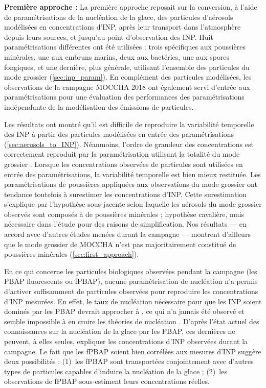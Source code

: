\medskip
\noindent
\textbf{Première approche :}  
La première approche reposait sur la conversion, à l’aide de paramétrisations de la nucléation de la glace, des particules d’aérosols modélisées en concentrations d’INP, après leur transport dans l’atmosphère depuis leurs sources, et jusqu’au point d’observation des INP.  
Huit paramétrisations différentes ont été utilisées : trois spécifiques aux poussières minérales, une aux embruns marins, deux aux bactéries, une aux spores fongiques, et une dernière, plus générale, utilisant l’ensemble des particules du mode grossier (\cref{sec:inp_param}).  
En complément des particules modélisées, les observations de la campagne MOCCHA 2018 ont également servi d’entrée aux paramétrisations pour une évaluation des performances des paramétrisations indépendante de la modélisation des émissions de particules.  

Les résultats ont montré qu’il est difficile de reproduire la variabilité temporelle des INP à partir des particules modélisées en entrée des paramétrisations (\cref{sec:aerosols_to_INP}).  
Néanmoins, l'ordre de grandeur des concentrations est correctement reproduit par la paramétrisation utilisant la totalité du mode grossier \citep{demott_predicting_2010}.  
Lorsque les concentrations observées de particules sont utilisées en entrée des paramétrisations, la variabilité temporelle est bien mieux restituée.  
Les paramétrisations de poussières appliquées aux observations du mode grossier ont tendance toutefois à surestimer les concentrations d’INP.  
Cette surestimation s’explique par l’hypothèse sous-jacente selon laquelle les aérosols du mode grossier observés sont composés à  de poussières minérales ; hypothèse cavalière, mais nécessaire dans l'étude pour des raisons de simplification. 
Nos résultats --- en accord avec d’autres études menées durant la campagne --- montrent d'ailleurs que le mode grossier de MOCCHA n’est pas majoritairement constitué de poussières minérales (\cref{sec:first_approach}).  

En ce qui concerne les particules biologiques observées pendant la campagne (les PBAP fluorescents ou fPBAP), aucune paramétrisation de nucléation n’a permis d’activer suffisamment de particules observées pour reproduire les concentrations d’INP mesurées.  
En effet, le taux de nucléation nécessaire pour que les INP soient dominés par les PBAP devrait approcher  à , ce qui n'a jamais été observé et semble impossible à en croire les théories de nucléation \citep{keita_new_2020}.  
D’après l’état actuel des connaissances sur la nucléation de la glace par les PBAP, ces dernières ne peuvent, à elles seules, expliquer les concentrations d’INP observées durant la campagne.  
Le fait que les fPBAP soient bien corrélées aux mesures d’INP suggère deux possibilités : (1)~les fPBAP sont transportées conjointement avec d’autres types de particules capables d’induire la nucléation de la glace ; (2)~les observations de fPBAP sous-estiment leurs concentrations réelles.

